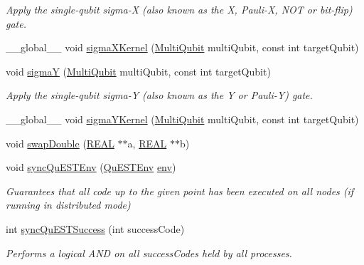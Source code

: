 \begin{DoxyCompactItemize}
\begin{DoxyCompactList}\small\item\em Apply the single-\/qubit sigma-\/X (also known as the X, Pauli-\/X, N\+OT or bit-\/flip) gate. \end{DoxyCompactList}\item 
\+\_\+\+\_\+global\+\_\+\+\_\+ void \mbox{\hyperlink{QuEST__env__localGPU_8cu_ad43da9e3fa8837956a5ea17f2259d65e}{sigma\+X\+Kernel}} (\mbox{\hyperlink{structMultiQubit}{Multi\+Qubit}} multi\+Qubit, const int target\+Qubit)
\item 
void \mbox{\hyperlink{QuEST__env__localGPU_8cu_a1f54d70a42403f7e1c2e2c2007332f61}{sigmaY}} (\mbox{\hyperlink{structMultiQubit}{Multi\+Qubit}} multi\+Qubit, const int target\+Qubit)
\begin{DoxyCompactList}\small\item\em Apply the single-\/qubit sigma-\/Y (also known as the Y or Pauli-\/Y) gate. \end{DoxyCompactList}\item 
\+\_\+\+\_\+global\+\_\+\+\_\+ void \mbox{\hyperlink{QuEST__env__localGPU_8cu_ac4766903f6ff9c70f6c957aa3d0a5c5f}{sigma\+Y\+Kernel}} (\mbox{\hyperlink{structMultiQubit}{Multi\+Qubit}} multi\+Qubit, const int target\+Qubit)
\item 
void \mbox{\hyperlink{QuEST__env__localGPU_8cu_aac328dfe6dd7cceec36a83d989b180b6}{swap\+Double}} (\mbox{\hyperlink{QuEST__precision_8h_a4b654506f18b8bfd61ad2a29a7e38c25}{R\+E\+AL}} $\ast$$\ast$a, \mbox{\hyperlink{QuEST__precision_8h_a4b654506f18b8bfd61ad2a29a7e38c25}{R\+E\+AL}} $\ast$$\ast$b)
\item 
void \mbox{\hyperlink{QuEST__env__localGPU_8cu_a8d31fe2d1ad4d01e2a1f5f6b8bc15b77}{sync\+Qu\+E\+S\+T\+Env}} (\mbox{\hyperlink{structQuESTEnv}{Qu\+E\+S\+T\+Env}} \mbox{\hyperlink{runTests_8c_a5fd8ba97fcae3408ae6221dfc3cc1f93}{env}})
\begin{DoxyCompactList}\small\item\em Guarantees that all code up to the given point has been executed on all nodes (if running in distributed mode) \end{DoxyCompactList}\item 
int \mbox{\hyperlink{QuEST__env__localGPU_8cu_ac7e38d768a1bd79019f88cc1e6295092}{sync\+Qu\+E\+S\+T\+Success}} (int success\+Code)
\begin{DoxyCompactList}\small\item\em Performs a logical A\+ND on all success\+Codes held by all processes. \end{DoxyCompactList}\item 

\end{DoxyCompactItemize}
